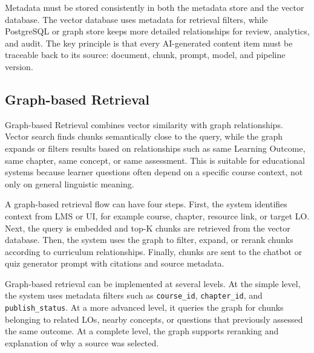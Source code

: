 Metadata must be stored consistently in both the metadata store and the
vector database. The vector database uses metadata for retrieval filters,
while PostgreSQL or graph store keeps more detailed relationships for
review, analytics, and audit. The key principle is that every AI-generated
content item must be traceable back to its source: document, chunk,
prompt, model, and pipeline version.

\subsection{Graph-based Retrieval}
\label{subsec:graph-based-retrieval}

Graph-based Retrieval combines vector similarity with graph relationships.
Vector search finds chunks semantically close to the query, while the
graph expands or filters results based on relationships such as same
Learning Outcome, same chapter, same concept, or same assessment. This is
suitable for educational systems because learner questions often depend
on a specific course context, not only on general linguistic meaning.

A graph-based retrieval flow can have four steps. First, the system
identifies context from LMS or UI, for example course, chapter, resource
link, or target LO. Next, the query is embedded and top-K chunks are
retrieved from the vector database. Then, the system uses the graph to
filter, expand, or rerank chunks according to curriculum relationships.
Finally, chunks are sent to the chatbot or quiz generator prompt with
citations and source metadata.

Graph-based retrieval can be implemented at several levels. At the simple
level, the system uses metadata filters such as \texttt{course\_id},
\texttt{chapter\_id}, and \texttt{publish\_status}. At a more advanced
level, it queries the graph for chunks belonging to related LOs, nearby
concepts, or questions that previously assessed the same outcome. At a
complete level, the graph supports reranking and explanation of why a
source was selected.

